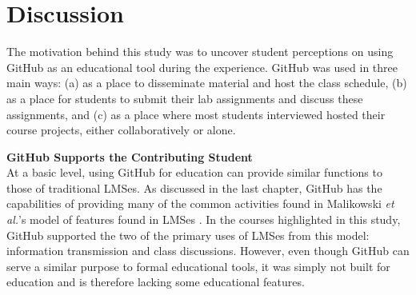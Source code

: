 \section{Discussion}
The motivation behind this study was to uncover student perceptions on using GitHub as an educational tool during the experience. GitHub was used in three main ways: (a) as a place to disseminate material and host the class schedule, (b) as a place for students to submit their lab assignments and discuss these assignments, and (c) as a place where most students interviewed hosted their course projects, either collaboratively or alone.




\textbf{GitHub Supports the Contributing Student} \\
At a basic level, using GitHub for education can provide similar functions to those of traditional LMSes. As discussed in the last chapter, GitHub has the capabilities of providing many of the common activities found in Malikowski \textit{et al.}'s model of features found in LMSes \cite{malikowski2007model}. In the courses highlighted in this study, GitHub supported the two of the primary uses of LMSes from this model: information transmission and class discussions. However, even though GitHub can serve a similar purpose to formal educational tools, it was simply not built for education and is therefore lacking some educational features.

